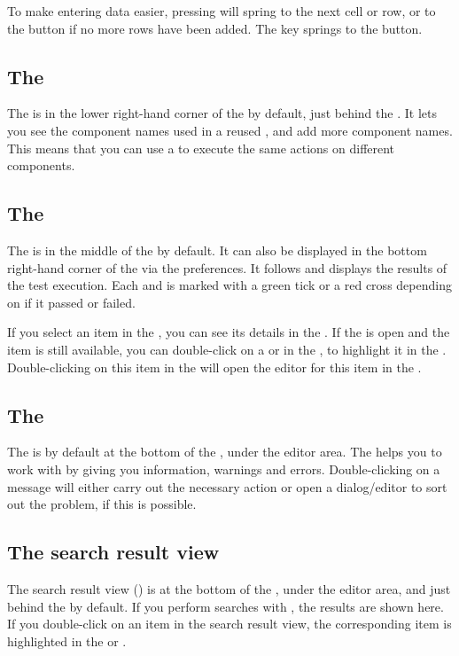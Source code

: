 To make entering data easier, pressing  will spring to the next cell or row, or to the  button if no more rows have been added. The  key  springs to the  button. 

\subsection{The \gdcompnamesview{}}
The \gdcompnamesview{} is in the lower right-hand corner of the \specpersp{}  by default, just behind the \gddatasetsview{}. It lets you see the component names used in a reused \gdcase{}, and add more component names. This means that you can use a \gdcase{} to execute the same actions on different components. 

\subsection{The \gdtestresultview{}} 

The \gdtestresultview{} is in the middle of the \execpersp{}  by default. It can also be displayed in the bottom right-hand corner of the \specpersp{} via the preferences. It follows and displays the results of the test execution. Each \gdstep{} and \gdcase{} is marked with a green tick or a red cross depending on if it passed or failed. 

If you select an item in the \gdtestresultview{}, you can see its details in the \gdpropview{}. If the \gdproject{} is open and the item is still available, you can double-click on a \gdstep{} or \gdcase{} in the \gdtestresultview{}, to highlight it in the \gdtestsuitebrowser{}. Double-clicking on this item in the \gdtestsuitebrowser{} will open the editor for this item in the \specpersp{}. 

\subsection{The \gdprobview{}}
The \gdprobview{} is by default at the bottom of the \specpersp{}, under the editor area. The \gdpropview{} helps you to work with \app{} by giving you information, warnings and errors. Double-clicking on a message will either carry out the necessary action or open a dialog/editor to sort out the problem, if this is possible. 

\subsection{The search result view}
The search result view () is at the bottom of the \specpersp{}, under the editor area, and just behind the \gdprobview{} by default. If you perform searches with \app{}, the results are shown here. If you double-click on an item in the search result view, the corresponding item is highlighted in the \gdtestcasebrowser{} or \gdtestsuitebrowser{}.  

